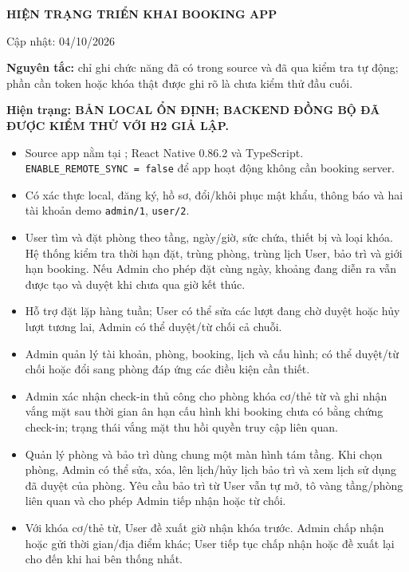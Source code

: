 \documentclass[12pt,a4paper]{article}
\begin{document}
\begin{center}
  {\LARGE\bfseries\color{hustred} HIỆN TRẠNG TRIỂN KHAI BOOKING APP}\par
  \vspace{0.1cm}
  {\small Cập nhật: 04/10/2026}
\end{center}

\textbf{Nguyên tắc:} chỉ ghi chức năng đã có trong source và đã qua kiểm tra tự động; phần cần token hoặc khóa thật được ghi rõ là chưa kiểm thử đầu cuối.

\textbf{Hiện trạng: BẢN LOCAL ỔN ĐỊNH; BACKEND ĐỒNG BỘ ĐÃ ĐƯỢC KIỂM THỬ VỚI H2 GIẢ LẬP.}

\begin{itemize}[leftmargin=1.6em,itemsep=2pt,topsep=2pt]
  \item Source app nằm tại ; React Native 0.86.2 và TypeScript. \texttt{ENABLE\_REMOTE\_SYNC = false} để app hoạt động không cần booking server.
  \item Có xác thực local, đăng ký, hồ sơ, đổi/khôi phục mật khẩu, thông báo và hai tài khoản demo \texttt{admin/1}, \texttt{user/2}.
  \item User tìm và đặt phòng theo tầng, ngày/giờ, sức chứa, thiết bị và loại khóa. Hệ thống kiểm tra thời hạn đặt, trùng phòng, trùng lịch User, bảo trì và giới hạn booking. Nếu Admin cho phép đặt cùng ngày, khoảng đang diễn ra vẫn được tạo và duyệt khi chưa qua giờ kết thúc.
  \item Hỗ trợ đặt lặp hàng tuần; User có thể sửa các lượt đang chờ duyệt hoặc hủy lượt tương lai, Admin có thể duyệt/từ chối cả chuỗi.
  \item Admin quản lý tài khoản, phòng, booking, lịch và cấu hình; có thể duyệt/từ chối hoặc đổi sang phòng đáp ứng các điều kiện cần thiết.
  \item Admin xác nhận check-in thủ công cho phòng khóa cơ/thẻ từ và ghi nhận vắng mặt sau thời gian ân hạn cấu hình khi booking chưa có bằng chứng check-in; trạng thái vắng mặt thu hồi quyền truy cập liên quan.
  \item Quản lý phòng và bảo trì dùng chung một màn hình tám tầng. Khi chọn phòng, Admin có thể sửa, xóa, lên lịch/hủy lịch bảo trì và xem lịch sử dụng đã duyệt của phòng. Yêu cầu bảo trì từ User vẫn tự mở, tô vàng tầng/phòng liên quan và cho phép Admin tiếp nhận hoặc từ chối.
  \item Với khóa cơ/thẻ từ, User đề xuất giờ nhận khóa trước. Admin chấp nhận hoặc gửi thời gian/địa điểm khác; User tiếp tục chấp nhận hoặc đề xuất lại cho đến khi hai bên thống nhất.

\end{itemize}
\end{document}
